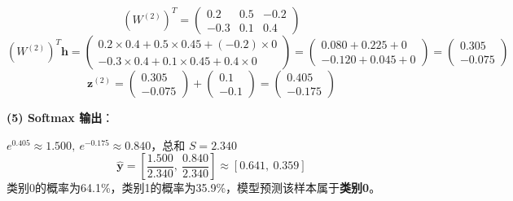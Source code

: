 \documentclass[a4paper,11pt]{ctexart}
\begin{document}
\begin{solutionbox}[参考答案与详细解析]
    \[
    (W^{(2)})^T = \begin{pmatrix}0.2&0.5&-0.2\\-0.3&0.1&0.4\end{pmatrix}
    \]
    \[
    (W^{(2)})^T\mathbf{h} = \begin{pmatrix}0.2\times0.4+0.5\times0.45+(-0.2)\times0\\-0.3\times0.4+0.1\times0.45+0.4\times0\end{pmatrix}
    = \begin{pmatrix}0.080+0.225+0\\-0.120+0.045+0\end{pmatrix}
    = \begin{pmatrix}0.305\\-0.075\end{pmatrix}
    \]
    \[
    \mathbf{z}^{(2)} = \begin{pmatrix}0.305\\-0.075\end{pmatrix} + \begin{pmatrix}0.1\\-0.1\end{pmatrix}
    = \boxed{\begin{pmatrix}0.405\\-0.175\end{pmatrix}}
    \]

    \textbf{(5) Softmax 输出}：

    $e^{0.405}\approx1.500,\ e^{-0.175}\approx0.840$，总和 $S=2.340$
    \[
    \hat{\mathbf{y}} = \left[\frac{1.500}{2.340},\ \frac{0.840}{2.340}\right] \approx \boxed{[0.641,\ 0.359]}
    \]
    类别0的概率为64.1\%，类别1的概率为35.9\%，模型预测该样本属于\textbf{类别0}。
\end{solutionbox}
\end{document}
